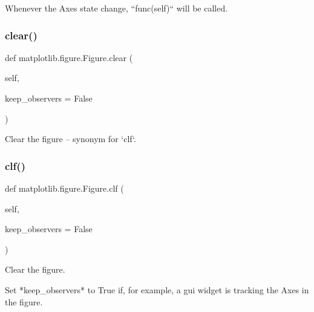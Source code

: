 \begin{DoxyVerb}Whenever the Axes state change, ``func(self)`` will be called.\end{DoxyVerb}
 \mbox{\label{classmatplotlib_1_1figure_1_1Figure_ad1179d56d2353a3c946640341b349510}} 
\subsubsection{\texorpdfstring{clear()}{clear()}}
{\footnotesize\ttfamily def matplotlib.\+figure.\+Figure.\+clear (\begin{DoxyParamCaption}\item[{}]{self,  }\item[{}]{keep\+\_\+observers = {\ttfamily False} }\end{DoxyParamCaption})}

\begin{DoxyVerb}Clear the figure -- synonym for `clf`.\end{DoxyVerb}
 \mbox{\label{classmatplotlib_1_1figure_1_1Figure_a2da4c35a0821ec608dc516a2cfeb6718}} 
\subsubsection{\texorpdfstring{clf()}{clf()}}
{\footnotesize\ttfamily def matplotlib.\+figure.\+Figure.\+clf (\begin{DoxyParamCaption}\item[{}]{self,  }\item[{}]{keep\+\_\+observers = {\ttfamily False} }\end{DoxyParamCaption})}

\begin{DoxyVerb}Clear the figure.

Set *keep_observers* to True if, for example,
a gui widget is tracking the Axes in the figure.
\end{DoxyVerb}
 \mbox{\label{classmatplotlib_1_1figure_1_1Figure_a4279527ad650fee5be6f271275a19e4b}} 
